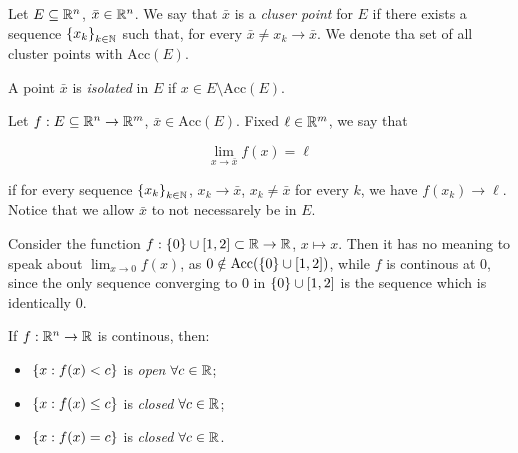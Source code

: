 \begin{definition}

    Let $E \subseteq {\mathbb{R}^n}$, $\bar{x} \in {\mathbb{R}^n}$. We say that $\bar{x}$ is a \emph{cluser point} for $E$ if there exists a sequence $\left\{ x_k \right\}_{k \in \mathbb{N}}$ such that, for every $\bar{x} \neq x_k \to \bar{x}$. We denote tha set of all cluster points with $\mathrm{Acc}(E)$.

    A point $\bar{x}$ is \emph{isolated} in $E$ if $x \in E \setminus \mathrm{Acc}(E)$.
    
\end{definition}

\begin{definition}[Limit]

    Let $f : E \subseteq {\mathbb{R}^n} \to \mathbb{R}^m$, $\bar{x} \in \mathrm{Acc}(E)$. Fixed $\ell \in \mathbb{R}^m$, we say that 

    \[ \lim_{x \to \bar{x}} f(x) = \ell \]

    if for every sequence $\left\{ x_k \right\}_{k \in \mathbb{N}}$, $x_k \to \bar{x}$, $x_k \neq \bar{x}$ for every $k$, we have $f(x_k) \to \ell$. Notice that we allow $\bar{x}$ to not necessarely be in $E$.
    
\end{definition}

\begin{example}
    
    Consider the function $f : \left\{ 0 \right\} \cup [1,2] \subset \mathbb{R} \to \mathbb{R}$, $x \mapsto x$. Then it has no meaning to speak about $\lim_{x \to 0} f(x)$, as $0 \notin \mathrm{Acc}(\left\{ 0 \right\} \cup [1,2])$, while $f$ is continous at $0$, since the only sequence converging to 0 in $\left\{ 0 \right\} \cup [1,2]$ is the sequence which is identically 0.

\end{example}

\begin{remark}
    
    If $f : {\mathbb{R}^n} \to \mathbb{R}$ is continous, then:
    
    \begin{itemize}
        \item $\left\{ x : f(x) < c \right\}$ is \emph{open} $\forall c \in \mathbb{R}$;
        \item $\left\{ x : f(x) \le c \right\}$ is \emph{closed} $\forall c \in \mathbb{R}$;
        \item $\left\{ x : f(x) = c \right\}$ is \emph{closed} $\forall c \in \mathbb{R}$.
    \end{itemize}

\end{remark}

